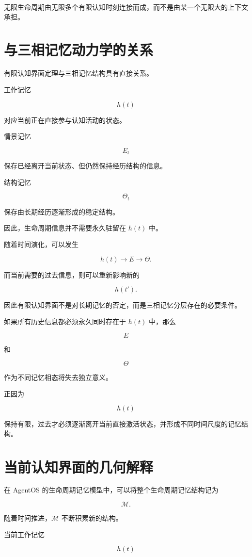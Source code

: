 无限生命周期由无限多个有限认知时刻连接而成，而不是由某一个无限大的上下文承担。


\section{与三相记忆动力学的关系}

有限认知界面定理与三相记忆结构具有直接关系。

工作记忆

\[
h(t)
\]

对应当前正在直接参与认知活动的状态。

情景记忆

\[
E_t
\]

保存已经离开当前状态、但仍然保持经历结构的信息。

结构记忆

\[
\Theta_t
\]

保存由长期经历逐渐形成的稳定结构。

因此，生命周期信息并不需要永久驻留在 $h(t)$ 中。

随着时间演化，可以发生

\[
h(t)
\rightarrow
E
\rightarrow
\Theta.
\]

而当前需要的过去信息，则可以重新影响新的

\[
h(t').
\]

因此有限认知界面不是对长期记忆的否定，而是三相记忆分层存在的必要条件。

如果所有历史信息都必须永久同时存在于 $h(t)$ 中，那么

\[
E
\]

和

\[
\Theta
\]

作为不同记忆相态将失去独立意义。

正因为

\[
h(t)
\]

保持有限，过去才必须逐渐离开当前直接激活状态，并形成不同时间尺度的记忆结构。


\section{当前认知界面的几何解释}

在 AgentOS 的生命周期记忆模型中，可以将整个生命周期记忆结构记为

\[
\mathcal{M}.
\]

随着时间推进，$\mathcal{M}$ 不断积累新的结构。

当前工作记忆

\[
h(t)
\]

